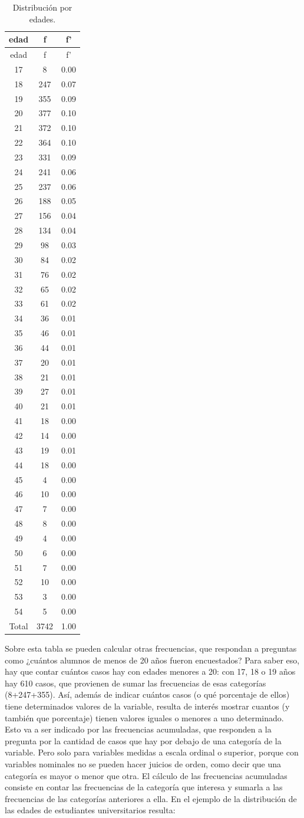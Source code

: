 \documentclass[]{book}
\begin{document}
\begin{longtable}[]{@{}ccc@{}}
\caption{\label{tab:unnamed-chunk-46}Distribución por edades.}\tabularnewline
\toprule
edad & f & f'\tabularnewline
\midrule
\endfirsthead
\toprule
edad & f & f'\tabularnewline
\midrule
\endhead
17 & 8 & 0.00\tabularnewline
18 & 247 & 0.07\tabularnewline
19 & 355 & 0.09\tabularnewline
20 & 377 & 0.10\tabularnewline
21 & 372 & 0.10\tabularnewline
22 & 364 & 0.10\tabularnewline
23 & 331 & 0.09\tabularnewline
24 & 241 & 0.06\tabularnewline
25 & 237 & 0.06\tabularnewline
26 & 188 & 0.05\tabularnewline
27 & 156 & 0.04\tabularnewline
28 & 134 & 0.04\tabularnewline
29 & 98 & 0.03\tabularnewline
30 & 84 & 0.02\tabularnewline
31 & 76 & 0.02\tabularnewline
32 & 65 & 0.02\tabularnewline
33 & 61 & 0.02\tabularnewline
34 & 36 & 0.01\tabularnewline
35 & 46 & 0.01\tabularnewline
36 & 44 & 0.01\tabularnewline
37 & 20 & 0.01\tabularnewline
38 & 21 & 0.01\tabularnewline
39 & 27 & 0.01\tabularnewline
40 & 21 & 0.01\tabularnewline
41 & 18 & 0.00\tabularnewline
42 & 14 & 0.00\tabularnewline
43 & 19 & 0.01\tabularnewline
44 & 18 & 0.00\tabularnewline
45 & 4 & 0.00\tabularnewline
46 & 10 & 0.00\tabularnewline
47 & 7 & 0.00\tabularnewline
48 & 8 & 0.00\tabularnewline
49 & 4 & 0.00\tabularnewline
50 & 6 & 0.00\tabularnewline
51 & 7 & 0.00\tabularnewline
52 & 10 & 0.00\tabularnewline
53 & 3 & 0.00\tabularnewline
54 & 5 & 0.00\tabularnewline
Total & 3742 & 1.00\tabularnewline
\bottomrule
\end{longtable}

Sobre esta tabla se pueden calcular otras frecuencias, que respondan a preguntas como ¿cuántos alumnos de menos de 20 años fueron encuestados? Para saber eso, hay que contar cuántos casos hay con edades menores a 20: con 17, 18 o 19 años hay 610 casos, que provienen de sumar las frecuencias de esas categorías (8+247+355).
Así, además de indicar cuántos casos (o qué porcentaje de ellos) tiene determinados valores de la variable, resulta de interés mostrar cuantos (y también que porcentaje) tienen valores iguales o menores a uno determinado. Esto va a ser indicado por las frecuencias acumuladas, que responden a la pregunta por la cantidad de casos que hay por debajo de una categoría de la variable. Pero solo para variables medidas a escala ordinal o superior, porque con variables nominales no se pueden hacer juicios de orden, como decir que una categoría es mayor o menor que otra. El cálculo de las frecuencias acumuladas consiste en contar las frecuencias de la categoría que interesa y sumarla a las frecuencias de las categorías anteriores a ella. En el ejemplo de la distribución de las edades de estudiantes universitarios resulta:
\end{document}
